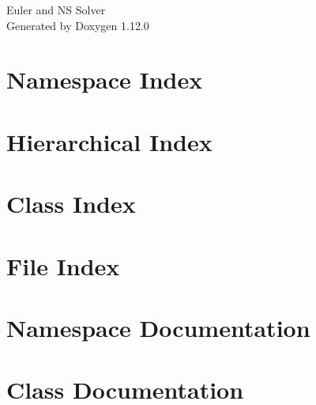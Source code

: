 \documentclass[twoside]{book}
\newcommand{\+}{\discretionary{\mbox{\scriptsize$\hookleftarrow$}}{}{}}
\newcommand{\clearemptydoublepage}{%
    \newpage{\pagestyle{empty}\cleardoublepage}%
  }
\begin{document}
  \raggedbottom
    \hypersetup{pageanchor=false,
                bookmarksnumbered=true,
                pdfencoding=unicode
               }
  \begin{titlepage}
  \vspace*{7cm}
  \begin{center}%
  {\Large Euler and NS Solver}\\
  \vspace*{1cm}
  {\large Generated by Doxygen 1.12.0}\\
  \end{center}
  \end{titlepage}
  \clearemptydoublepage
  \tableofcontents
  \clearemptydoublepage
  \hypersetup{pageanchor=true}
\chapter{Namespace Index}

\chapter{Hierarchical Index}

\chapter{Class Index}

\chapter{File Index}

\chapter{Namespace Documentation}


\chapter{Class Documentation}































\end{document}
